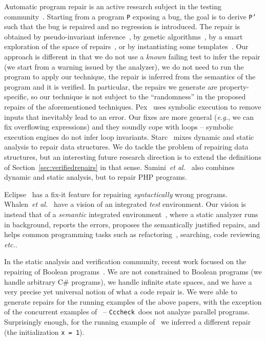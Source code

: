 \documentclass[10pt]{sigplanconf}
\newcommand{\code}[1]{\texttt{#1}}
\newcommand{\Clousot}{\code{Cccheck}}
\begin{document}
Automatic program repair is an active research subject in the testing
community~\cite{PezzeEtAl11}.  Starting from a program \code{P}
exposing a bug, the goal is to derive \code{P'} such that the bug is
repaired and no regression is introduced.  The repair is obtained by
pseudo-invariant inference~\cite{PerkinsEtAl09}, by genetic
algorithms~\cite{WeimerEtAl09,LeGouesEtAl-ICSE12}, by a smart exploration of the space of repairs~\cite{ChandraEtAl11}, or by instantiating some
templates~\cite{WeiEtAl}.  
Our approach is different in that we do not use a \emph{known} failing test to infer the repair (we start from a warning issued by the analyzer), we do not
need to run the program to apply our technique, the repair is inferred from the semantics of the program and it is verified.
In particular, the repairs we generate are property-specific, so our technique is not subject to the ``randomness'' in the proposed repairs of the aforementioned techniques.
Pex~\cite{Pex} uses symbolic execution to remove inputs that inevitably lead to an error.  
Our fixes are more general (\emph{e.g.}, we can fix overflowing expressions) and they soundly cope with loops -- symbolic execution engines do not infer loop invariants.
Starc~\cite{starc} mixes dynamic and static analysis to repair data structures.
We do tackle the problem of repairing data structures, but an interesting future research direction is to extend the definitions of Section~\ref{sec:verifiedrepairs} in that sense.
Samini~\emph{et al.}~\cite{SaminiEtAl-ICSE12} also combines dynamic and static analysis, but to repair PHP programs. 

Eclipse~\cite{eclipse} has a fix-it feature for repairing \emph{syntactically} wrong programs.
Whalen~\emph{et al.}~\cite{FITE} have a vision of an integrated \emph{test} environment.
Our vision is instead that of a \emph{semantic} integrated environment~\cite{LogozzoEtAlDemoOOPSLA12}, where a static analyzer runs in background, reports the errors, proposes the semantically justified repairs, and helps common programming tasks such as refactoring~\cite{CousotCousotLogozzoBarnett-OOPSLA12}, searching, code reviewing \emph{etc.}.

In the static analysis and verification community, recent work focused
on the repairing of Boolean
programs~\cite{SamantaEtAl08,JobstmannEtAl05,GriesmayerEtAl06}.  We
are not constrained to Boolean programs (we handle arbitrary C\#
programs), we handle infinite state spaces, and we have a very precise
yet universal notion of what a code repair is.  We were able to
generate repairs for the running examples of the above papers, with
the exception of the concurrent examples of~\cite{JobstmannEtAl05} -- \Clousot\ does not analyze parallel programs.  Surprisingly enough,
for the running example of~\cite{GriesmayerEtAl06} we inferred a
different repair (the initialization \code{x = 1}).
\end{document}
